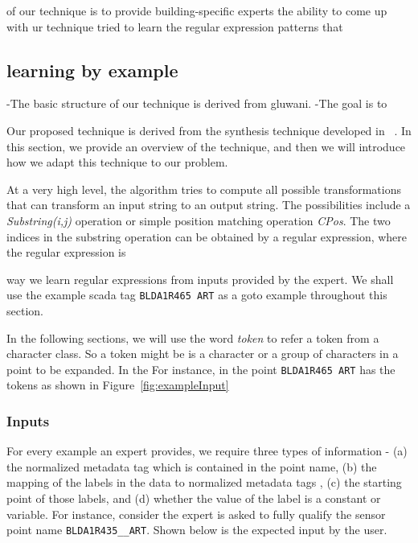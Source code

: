 of our technique is to provide building-specific experts the ability to come up with ur technique tried to learn the regular expression patterns that 
\subsection{learning by example}

-The basic structure of our technique is derived from gluwani.
-The goal is to 

Our proposed technique is derived from the synthesis technique developed in ~\cite{}. In this section, we provide an overview of the technique, and then we will introduce how we adapt this technique to our problem. 

At a very high level, the algorithm tries to compute all possible transformations that can transform an input string to an output string. The possibilities include a {\it Substring(i,j)} operation or simple position matching operation {\it{CPos}}. The two indices in the substring operation can be obtained by a regular expression, where the regular expression is  



 way we learn regular expressions from inputs provided by the expert. We shall use the example scada tag {\tt BLDA1R465  ART} as a goto example throughout this section.

In the following sections, we will use the word {\it token} to refer a token from a character class. So a token might be is a character or a group of characters in a point to be expanded. In the For instance, in the point {\tt BLDA1R465 ART} has the tokens as shown in Figure~\ref{fig:exampleInput}


\subsubsection{Inputs}

For every example an expert provides, we require three types of information - (a) the normalized metadata tag which is contained in the point name,  (b) the mapping of the labels in the data to normalized metadata tags , (c) the starting point of those labels, and (d) whether the value of the label is a constant or variable. For instance, consider the expert is asked to fully qualify the sensor point name \texttt{BLDA1R435\_\_ART}. Shown below is the expected input by the user.

